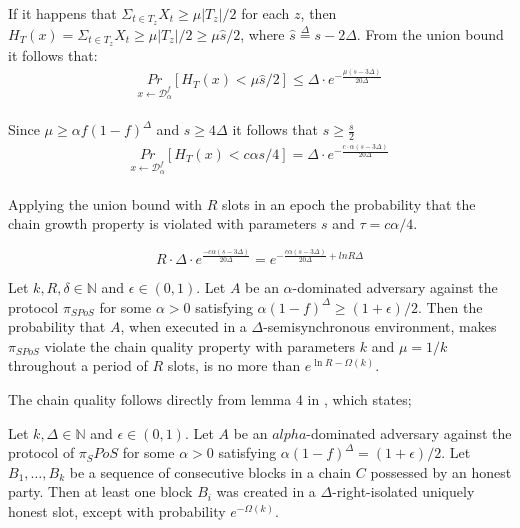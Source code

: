 If it happens that $\Sigma_{t\in T_{z}} X_t \geq \mu |T_z|/2$ for each $z$, then $H_T(x) = \Sigma_{t\in T_{z}} X_t \geq \mu |T_z|/2 \geq \mu\hat{s}/2$, where $ \hat{s} \overset{\Delta}{=}s-2\Delta$. From the union bound it follows that:
\begin{align*}
    \underset{x \xleftarrow[]{} \mathcal{D}^f_{\alpha}}{Pr}[H_T(x) < \mu \hat{s} / 2] \leq \Delta \cdot e^{-\frac{\mu(s-3\Delta)}{20\Delta}}
\end{align*}

Since $\mu \geq \alpha f(1-f)^{\Delta}$ and $s \geq 4 \Delta$ it follows that $\hat{s} \geq \frac{s}{2}$
\begin{align*}
    \underset{x \xleftarrow[]{} \mathcal{D}^f_{\alpha}}{Pr} [H_T(x) < c \alpha s/4] = \Delta \cdot e^{-\frac{c \cdot \alpha(s-3\Delta)}{20\Delta}}
\end{align*}

Applying the union bound with $R$ slots in an epoch the probability that the chain growth property is violated with parameters $s$ and $\tau = c\alpha/4$.

\begin{equation*}
    R \cdot \Delta \cdot e^{\frac{-c\alpha(s-3\Delta)}{20\Delta}} = e^{-\frac{c\alpha(s-3\Delta)}{20\Delta} + ln R \Delta}
\end{equation*}

\begin{theorem}
    Let $k,R,\delta \in \mathbb{N}$ and $\epsilon \in (0,1)$. Let $A$ be an $\alpha$-dominated adversary against the protocol $\pi_{SPoS}$ for some $\alpha > 0$ satisfying $\alpha(1-f)^{\Delta} \geq (1+\epsilon)/2$. Then the probability that $A$, when executed in a $\Delta$-semisynchronous environment, makes $\pi_{SPoS}$ violate the chain quality property with parameters $k$ and $\mu = 1/k$ throughout a period of $R$ slots, is no more than $e^{\ln R - \Omega(k)}$. 
\end{theorem}

The chain quality follows directly from lemma 4 in \cite{ouroboros-praos}, which states;

\begin{lemma}
Let $k, \Delta \in \mathbb{N}$ and $\epsilon \in (0,1)$. Let $A$ be an $alpha$-dominated adversary against the protocol of $\pi_SPoS$ for some $\alpha > 0$ satisfying $\alpha(1-f)^{\Delta} = (1+\epsilon)/2$. Let $B_1, \dots, B_k$ be a sequence of consecutive blocks in a chain $C$ possessed by an honest party. Then at least one block $B_i$ was created in a $\Delta$-right-isolated uniquely honest slot, except with probability $e^{-\Omega(k)}$.
\end{lemma}

